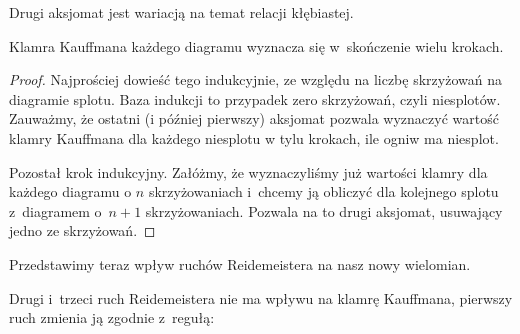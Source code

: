 Drugi aksjomat jest wariacją na temat relacji kłębiastej.

\begin{lemma}
    Klamra Kauffmana każdego diagramu wyznacza się w~skończenie wielu krokach.
\end{lemma}

\begin{proof}
    Najprościej dowieść tego indukcyjnie, ze względu na liczbę skrzyżowań na diagramie splotu.
    Baza indukcji to przypadek zero skrzyżowań, czyli niesplotów.
    Zauważmy, że ostatni (i później pierwszy) aksjomat pozwala wyznaczyć wartość klamry Kauffmana dla każdego niesplotu w tylu krokach, ile ogniw ma niesplot.

    Pozostał krok indukcyjny.
    Załóżmy, że wyznaczyliśmy już wartości klamry dla każdego diagramu o $n$ skrzyżowaniach i~chcemy ją obliczyć dla kolejnego splotu z~diagramem o~$n + 1$ skrzyżowaniach.
    Pozwala na to drugi aksjomat, usuwający jedno ze skrzyżowań.
\end{proof}

Przedstawimy teraz wpływ ruchów Reidemeistera na nasz nowy wielomian.

\begin{lemma}
    Drugi i~trzeci ruch Reidemeistera nie ma wpływu na klamrę Kauffmana,
    pierwszy ruch zmienia ją zgodnie z~regułą:
\begin{comment}
    \begin{equation}
        \bracket{\MediumThinReidemeisterOneLeft} = -A^{-3} \bracket{\,\MediumThinReidemeisterOneStraight\,}.
    \end{equation}
\end{comment}
\end{lemma}

